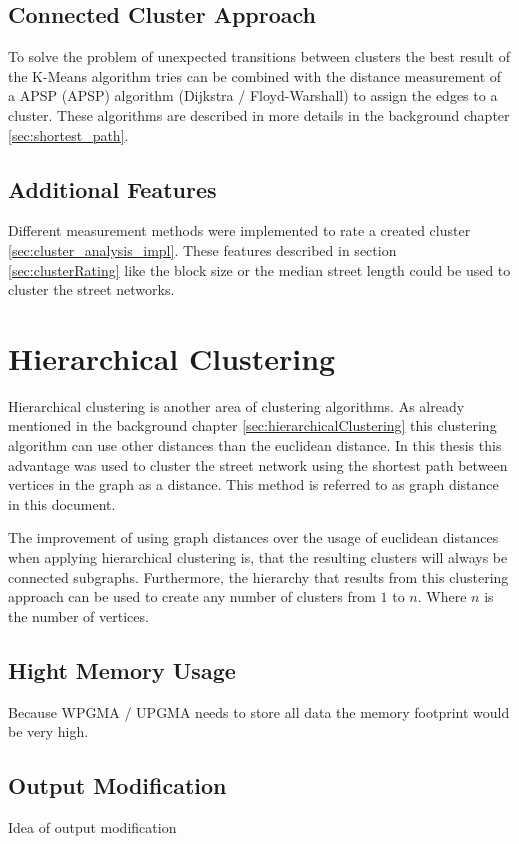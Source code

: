 \subsection{Connected Cluster Approach} \label{sec:connected_cluster_approach}
To solve the problem of unexpected transitions between clusters the best result of the K-Means algorithm tries can be combined with the distance measurement of a \acrlong{APSP} (\acrshort{APSP}) algorithm (Dijkstra / Floyd-Warshall) to assign the edges to a cluster. These algorithms are described in more details in the background chapter \ref{sec:shortest_path}.

\subsection{Additional Features}
Different measurement methods were implemented to rate a created cluster \ref{sec:cluster_analysis_impl}. These features described in section \ref{sec:clusterRating} like the block size or the median street length could be used to cluster the street networks.

\pagebreak
\section{Hierarchical Clustering}
Hierarchical clustering is another area of clustering algorithms. As already mentioned in the background chapter \ref{sec:hierarchicalClustering} this clustering algorithm can use other distances than the euclidean distance. In this thesis this advantage was used to cluster the street network using the shortest path between vertices in the graph as a distance. This method is referred to as graph distance in this document.

The improvement of using graph distances over the usage of euclidean distances when applying hierarchical clustering is, that the resulting clusters will always be connected subgraphs. Furthermore, the hierarchy that results from this clustering approach can be used to create any number of clusters from $1$ to $n$. Where $n$ is the number of vertices.

\subsection{Hight Memory Usage}
Because WPGMA / UPGMA needs to store all data the memory footprint would be very high. %

\subsection{Output Modification}
Idea of output modification

